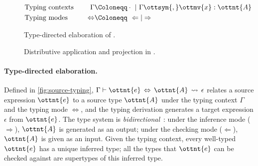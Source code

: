 \begin{figure}[t]
  \small
  \begin{align*}
    &\text{Typing contexts} &\quad\Gamma &\Coloneqq \cdot ~|~ \Gamma  \ottsym{,}  \ottmv{x}  :  \ottnt{A} \\
    &\text{Typing modes} &\quad\Leftrightarrow &\Coloneqq~  \Leftarrow  |  \Rightarrow  \\
  \end{align*}

  \ottdefnsElaboration

  \caption{Type-directed elaboration of \lambdaiplus.}
  \label{fig:source-typing}
\end{figure}

\begin{figure}[t]
  \small

  \ottdefnsDistributiveApplication
  \ottdefnsProjection

  \caption{Distributive application and projection in \lambdaiplus.}
  \label{fig:source-dist}
\end{figure}

\paragraph{Type-directed elaboration.}
Defined in \autoref{fig:source-typing}, $\Gamma  \vdash  \ottnt{e} \, \Leftrightarrow \, \ottnt{A}  \,\rightsquigarrow\,  \epsilon$ relates a
source expression $\ottnt{e}$ to a source type $\ottnt{A}$ under the typing context
$\Gamma$ and the typing mode $\Leftrightarrow$, and the typing derivation generates a
target expression $\epsilon$ from $\ottnt{e}$. The type system is
\emph{bidirectional}~\citep{pierce2000local}: under the inference mode
($ \Rightarrow $), $\ottnt{A}$ is generated as an output; under the checking mode
($ \Leftarrow $), $\ottnt{A}$ is given as an input. Given the typing context, every
well-typed $\ottnt{e}$ has a unique inferred type; all the types that $\ottnt{e}$ can be
checked against are supertypes of this inferred type.

